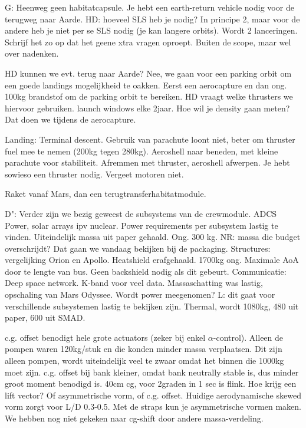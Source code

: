 G: Heenweg geen habitatcapsule. Je hebt een earth-return vehicle nodig voor de terugweg naar Aarde. HD: hoeveel SLS heb je nodig? In principe 2, maar voor de andere heb je niet per se SLS nodig (je kan langere orbits). Wordt 2 lanceringen. Schrijf het zo op dat het geene xtra vragen oproept. Buiten de scope, maar wel over nadenken.

 

HD kunnen we evt. terug naar Aarde? Nee, we gaan voor een parking orbit om een goede landings mogelijkheid te oakken.  Eerst een aerocapture en dan ong. 100kg brandstof om de parking orbit te bereiken. HD vraagt welke thrusters we hiervoor gebruiken.
launch windows elke 2jaar. Hoe wil je density gaan meten? Dat doen we tijdens de aerocapture.

Landing: Terminal descent. Gebruik van parachute loont niet, beter om thruster fuel mee te nemen (200kg tegen 280kg). Aeroshell naar beneden, met kleine parachute voor stabiliteit. Afremmen met thruster, aeroshell afwerpen. Je hebt sowieso een thruster nodig. Vergeet motoren niet.

Raket vanaf Mars, dan een terugtransferhabitatmodule. 

D": Verder zijn we bezig geweest de subsystems van de crewmodule. 
ADCS
Power, solar arrays ipv nuclear. Power requirements per subsystem lastig te vinden. Uiteindelijk massa uit paper gehaald. Ong. 300 kg.
NR: massa die budget overschrijdt? Dat gaan we vandaag bekijken bij de packaging.
Structures: vergelijking Orion en Apollo. Heatshield erafgehaald. 1700kg ong.
Maximale AoA door te lengte van bus. Geen backshield nodig als dit gebeurt.
Communicatie: Deep space network. K-band voor veel data. Massaschatting was lastig, opschaling van Mars Odyssee. Wordt power meegenomen? L: dit gaat voor verschillende subsystemen lastig te bekijken zijn. 
Thermal, wordt 1080kg, 480 uit paper, 600 uit SMAD.

c.g. offset benodigt hele grote actuators (zeker bij enkel $\alpha$-control). Alleen de pompen waren 120kg/stuk en die konden minder massa verplaatsen. Dit zijn alleen pompen, wordt uiteindelijk veel te zwaar omdat het binnen die 1000kg moet zijn. c.g. offset bij bank kleiner, omdat bank neutrally stable is, dus minder groot moment benodigd is. 40cm cg, voor 2graden in 1 sec is flink. Hoe krijg een lift vector? Of asymmetrische vorm, of c.g. offset. Huidige aerodynamische skewed vorm zorgt voor L/D 0.3-0.5. Met de straps kun je asymmetrische vormen maken. We hebben nog niet gekeken naar cg-shift door andere massa-verdeling. 

